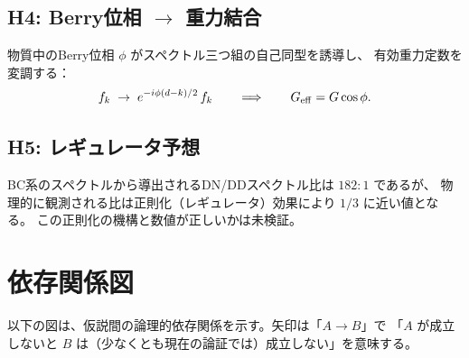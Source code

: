 \subsection{H4: Berry位相 $\to$ 重力結合}

\begin{hypbox}[H4: Berry位相と重力の結合]
物質中のBerry位相 $\phi$ がスペクトル三つ組の自己同型を誘導し、
有効重力定数を変調する：
\[
  f_k \;\to\; e^{-i\phi(d-k)/2}\, f_k
  \qquad\Longrightarrow\qquad
  G_{\mathrm{eff}} = G\cos\phi.
\]
\end{hypbox}

\subsection{H5: レギュレータ予想}

\begin{hypbox}[H5: レギュレータ予想（182 vs 1/3）]
BC系のスペクトルから導出されるDN/DDスペクトル比は $182:1$ であるが、
物理的に観測される比は正則化（レギュレータ）効果により $1/3$ に近い値となる。
この正則化の機構と数値が正しいかは未検証。
\end{hypbox}

\section{依存関係図}
\label{sec:17.3}

以下の図は、仮説間の論理的依存関係を示す。矢印は「$A \to B$」で
「$A$ が成立しないと $B$ は（少なくとも現在の論証では）成立しない」を意味する。

